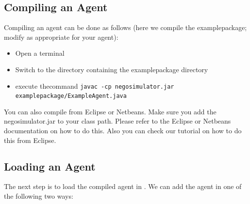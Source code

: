 \documentclass[]{article}
\begin{document}
\subsection{Compiling an Agent}
Compiling an agent can be done as follows (here we compile the examplepackage; modify as appropriate for your agent):
\begin{itemize}
\item Open a terminal
\item Switch to the directory containing the examplepackage directory
\item execute thecommand \texttt{javac -cp negosimulator.jar examplepackage/ExampleAgent.java}
\end{itemize}

You can also compile from Eclipse or Netbeans. Make sure you add the negosimulator.jar to your class path. Please refer to the Eclipse or Netbeans documentation on how to do this. Also you can check our tutorial on how to do this from Eclipse.

\subsection{Loading an Agent}
The next step is to load the compiled agent in \Genius. We can add the agent in one of the following two ways:
\end{document}
